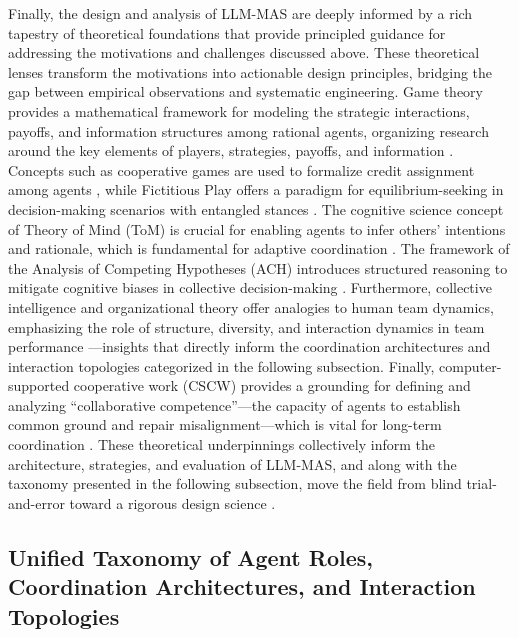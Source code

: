 \documentclass[11pt]{article}
\begin{document}
Finally, the design and analysis of LLM-MAS are deeply informed by a rich tapestry of theoretical foundations that provide principled guidance for addressing the motivations and challenges discussed above. These theoretical lenses transform the motivations into actionable design principles, bridging the gap between empirical observations and systematic engineering. Game theory provides a mathematical framework for modeling the strategic interactions, payoffs, and information structures among rational agents, organizing research around the key elements of players, strategies, payoffs, and information \cite{ref6}. Concepts such as cooperative games are used to formalize credit assignment among agents \cite{ref34,ref35}, while Fictitious Play offers a paradigm for equilibrium-seeking in decision-making scenarios with entangled stances \cite{ref36}. The cognitive science concept of Theory of Mind (ToM) is crucial for enabling agents to infer others' intentions and rationale, which is fundamental for adaptive coordination \cite{ref25,ref37}. The framework of the Analysis of Competing Hypotheses (ACH) introduces structured reasoning to mitigate cognitive biases in collective decision-making \cite{ref38}. Furthermore, collective intelligence and organizational theory offer analogies to human team dynamics, emphasizing the role of structure, diversity, and interaction dynamics in team performance \cite{ref39}---insights that directly inform the coordination architectures and interaction topologies categorized in the following subsection. Finally, computer-supported cooperative work (CSCW) provides a grounding for defining and analyzing ``collaborative competence''---the capacity of agents to establish common ground and repair misalignment---which is vital for long-term coordination \cite{ref40}. These theoretical underpinnings collectively inform the architecture, strategies, and evaluation of LLM-MAS, and along with the taxonomy presented in the following subsection, move the field from blind trial-and-error toward a rigorous design science \cite{ref21}.

\subsection{Unified Taxonomy of Agent Roles, Coordination Architectures, and Interaction Topologies}
\end{document}
